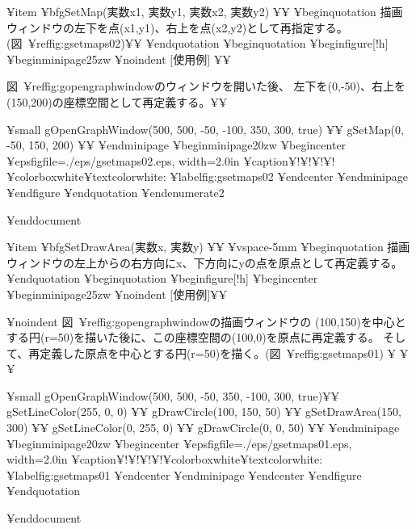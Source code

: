 ¥item {¥bf{gSetMap(実数x1, 実数y1, 実数x2, 実数y2)}} ¥¥
  ¥begin{quotation}
     描画ウィンドウの左下を点(x1,y1)、右上を点(x2,y2)として再指定する。
     (図~¥ref{fig:gsetmaps02})¥¥
  ¥end{quotation}
¥begin{quotation}
¥begin{figure}[!h]
¥begin{minipage}{25zw}
¥noindent $[$使用例$]$ ¥¥

図~¥ref{fig:gopengraphwindow}のウィンドウを開いた後、
左下を(0,-50)、右上を(150,200)の座標空間として再定義する。¥¥


{¥small{
 gOpenGraphWindow(500, 500, -50, -100, 350, 300, true) ¥¥
 gSetMap(0, -50, 150, 200) ¥¥
}}
¥end{minipage}
¥begin{minipage}{20zw}
¥begin{center}
¥epsfig{file=./eps/gsetmaps02.eps, width=2.0in}
¥caption{$¥!¥!¥!¥!$¥colorbox{white}{{¥textcolor{white}{:}}}}
¥label{fig:gsetmaps02}
¥end{center}
¥end{minipage}
¥end{figure}
   ¥end{quotation}
¥end{enumerate2}

¥end{document}

¥item {¥bf{gSetDrawArea(実数x, 実数y)}} ¥¥
¥vspace{-5mm}
   ¥begin{quotation}
     描画ウィンドウの左上からの右方向にx、下方向にyの点を原点として再定義する。
   ¥end{quotation}
   ¥begin{quotation}
¥begin{figure}[!h]
¥begin{center}
¥begin{minipage}{25zw}
	   ¥noindent $[$使用例$]$¥¥

¥noindent 図~¥ref{fig:gopengraphwindow}の描画ウィンドウの
(100,150)を中心とする円(r=50)を描いた後に、この座標空間の(100,0)を原点に再定義する。
そして、再定義した原点を中心とする円(r=50)を描く。(図~¥ref{fig:gsetmaps01})
¥ ¥¥

{¥small{
          gOpenGraphWindow(500, 500, -50, 350, -100, 300, true)¥¥
          gSetLineColor(255, 0, 0)  ¥¥
          gDrawCircle(100, 150, 50)  ¥¥
          gSetDrawArea(150, 300) ¥¥
          gSetLineColor(0, 255, 0)  ¥¥
          gDrawCircle(0, 0, 50)  ¥¥
}}
¥end{minipage}
¥begin{minipage}{20zw}
¥begin{center}
¥epsfig{file=./eps/gsetmaps01.eps, width=2.0in}
¥caption{$¥!¥!¥!¥!$¥colorbox{white}{{¥textcolor{white}{:}}}}
¥label{fig:gsetmaps01}
¥end{center}
¥end{minipage}
¥end{center}
¥end{figure}
   ¥end{quotation}


¥end{document}


